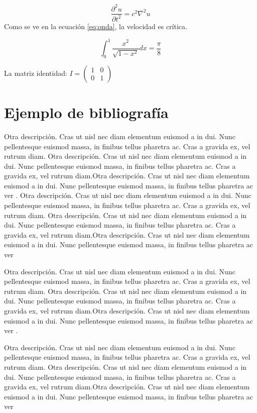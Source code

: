 \documentclass[b5paper, 10pt]{book}
\begin{document}
\begin{equation}
	\label{eq:onda}
	\frac{\partial^2 u}{\partial t^2} = c^2 \nabla^2 u
\end{equation}
Como se ve en la ecuación \ref{eq:onda}, la velocidad es crítica.

\begin{equation}
	\label{eq:integral}
	\int_0^1 \frac{x^2}{\sqrt{1 - x^2}} dx = \frac{\pi}{8}
\end{equation}

La matriz identidad: \(
I = \begin{pmatrix}
	1 & 0 \\
	0 & 1
\end{pmatrix}
\)

\section {Ejemplo de bibliografía}
Otra descripción. Cras ut nisl nec diam elementum euismod a in dui. Nunc pellentesque euismod massa, in finibus tellus pharetra ac. Cras a gravida ex, vel rutrum diam. Otra descripción. Cras ut nisl nec diam elementum euismod a in dui. Nunc pellentesque euismod massa, in finibus tellus pharetra ac. Cras a gravida ex, vel rutrum diam.Otra descripción. Cras ut nisl nec diam elementum euismod a in dui. Nunc pellentesque euismod massa, in finibus tellus pharetra ac ver \citep{Feng2025}. 
Otra descripción. Cras ut nisl nec diam elementum euismod a in dui. Nunc pellentesque euismod massa, in finibus tellus pharetra ac. Cras a gravida ex, vel rutrum diam. Otra descripción. Cras ut nisl nec diam elementum euismod a in dui. Nunc pellentesque euismod massa, in finibus tellus pharetra ac. Cras a gravida ex, vel rutrum diam.Otra descripción. Cras ut nisl nec diam elementum euismod a in dui. Nunc pellentesque euismod massa, in finibus tellus pharetra ac ver \citep{Jana2020}

Otra descripción. Cras ut nisl nec diam elementum euismod a in dui. Nunc pellentesque euismod massa, in finibus tellus pharetra ac. Cras a gravida ex, vel rutrum diam. Otra descripción. Cras ut nisl nec diam elementum euismod a in dui. Nunc pellentesque euismod massa, in finibus tellus pharetra ac. Cras a gravida ex, vel rutrum diam.Otra descripción. Cras ut nisl nec diam elementum euismod a in dui. Nunc pellentesque euismod massa, in finibus tellus pharetra ac ver \citep{Liang2022}.

\citet{Liang2022} Otra descripción. Cras ut nisl nec diam elementum euismod a in dui. Nunc pellentesque euismod massa, in finibus tellus pharetra ac. Cras a gravida ex, vel rutrum diam. Otra descripción. Cras ut nisl nec diam elementum euismod a in dui. Nunc pellentesque euismod massa, in finibus tellus pharetra ac. Cras a gravida ex, vel rutrum diam.Otra descripción. Cras ut nisl nec diam elementum euismod a in dui. Nunc pellentesque euismod massa, in finibus tellus pharetra ac ver
\end{document}

